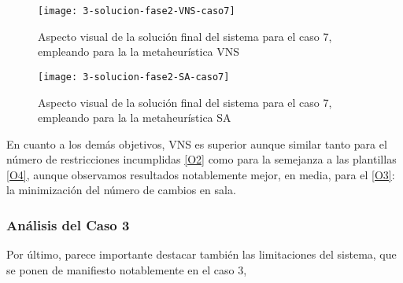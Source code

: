 \begin{figure}
	\centering
	\texttt{[image: 3-solucion-fase2-VNS-caso7]}
	\caption{Aspecto visual de la solución final del sistema para el caso 7, empleando para la \fasedos{} la metaheurística VNS}
	\label{fig:5:solucion-fase2-vns-caso7}
\end{figure}

\begin{figure}
	\centering
	\texttt{[image: 3-solucion-fase2-SA-caso7]}
	\caption{Aspecto visual de la solución final del sistema para el caso 7, empleando para la \fasedos{} la metaheurística SA}
	\label{fig:5:solucion-fase2-sa-caso7}
\end{figure}

En cuanto a los demás objetivos, VNS es superior aunque similar tanto para el número de restricciones incumplidas \ref{O2} como para la semejanza a las plantillas \ref{O4}, aunque observamos resultados notablemente mejor, en media, para el \ref{O3}: la minimización del número de cambios en sala.

\subsubsection{Análisis del Caso 3}

Por último, parece importante destacar también las limitaciones del sistema, que se ponen de manifiesto notablemente en el caso 3, 



